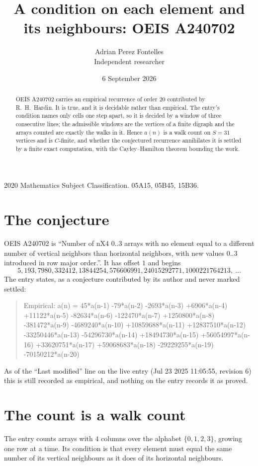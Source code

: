 \documentclass[11pt,a4paper]{article}
\title{A condition on each element and its neighbours: OEIS A240702}
\author{Adrian Perez Fontelles\\ \small Independent researcher}
\date{6 September 2026}
\theoremstyle{plain}
\theoremstyle{definition}
\begin{document}
\maketitle

\begin{abstract}
OEIS A240702 carries an empirical recurrence of order $20$ contributed by R.~H.~Hardin. It is
true, and it is decidable rather than empirical. The entry's condition names only cells one step apart, so it is decided by a window of
three consecutive lines; the
admissible windows are the vertices of a finite digraph and the arrays counted are exactly the
walks in it. Hence $a(n)$ is a walk count on $S=31$ vertices and is $C$-finite, and whether the
conjectured recurrence annihilates it is settled by a finite exact computation, with the
Cayley--Hamilton theorem bounding the work.
\end{abstract}

\noindent\small 2020 Mathematics Subject Classification. 05A15, 05B45, 15B36.\normalsize

\section{The conjecture}

OEIS A240702 is ``Number of nX4 0..3 arrays with no element equal to a different number of vertical neighbors than horizontal neighbors, with new values 0..3 introduced in row major order.''. It has offset $1$ and begins
\[
5, 193, 7980, 332412, 13844254, 576606991, 24015292771, 1000221764213,\ \dots
\]
The entry states, as a conjecture contributed by its author and never marked settled:
\begin{quote}
Empirical: a(n) = 45*a(n-1) -79*a(n-2) -2693*a(n-3) +6906*a(n-4) +11122*a(n-5) -82634*a(n-6) -122470*a(n-7) +1250800*a(n-8) -381472*a(n-9) -4689240*a(n-10) +10859688*a(n-11) +12837510*a(n-12) -33250446*a(n-13) -54296730*a(n-14) +18494730*a(n-15) +56054997*a(n-16) +33620751*a(n-17) +59068683*a(n-18) -29229255*a(n-19) -70150212*a(n-20)
\end{quote}
As of the ``Last modified'' line on the live entry (Jul 23 2025 11:05:55, revision 6) this is still
recorded as empirical, and nothing on the entry records it as proved.

\section{The count is a walk count}

The entry counts arrays with $4$ columns over the alphabet $\{0,1,2,3\}$, growing one row at a time. Its condition is that every element must equal the same number of its vertical neighbours as it does of its horizontal neighbours.
\end{document}
